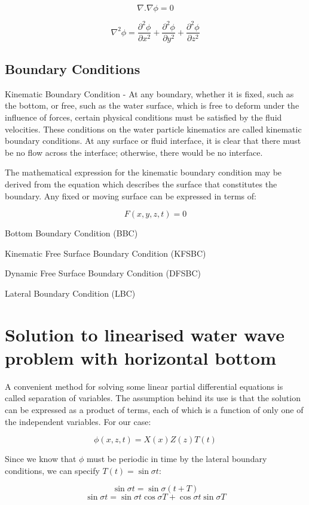 \documentclass{report}
\begin{document}
\[ \nabla . \nabla\phi =0 \]

\[ \nabla^2 \phi = \frac{\partial^2 \phi}{\partial x^2} + \frac{\partial^2 \phi}{\partial y^2} + \frac{\partial^2 \phi}{\partial z^2} \]

\subsection{Boundary Conditions}

Kinematic Boundary Condition - At any boundary, whether it is fixed, such as the bottom, or free, such as the water surface, which is free to deform under the influence of forces, certain physical conditions must be satisfied by the fluid velocities. These conditions on the water particle kinematics are called kinematic boundary conditions. At any surface or fluid interface, it is clear that there must be no flow across the interface; otherwise, there would be no interface.

The mathematical expression for the kinematic boundary condition may be derived from the equation which describes the surface that constitutes the boundary. Any fixed or moving surface can be expressed in terms of:

\[ F(x, y, z, t) = 0 \]

Bottom Boundary Condition (BBC)

Kinematic Free Surface Boundary Condition (KFSBC)

Dynamic Free Surface Boundary Condition (DFSBC)

Lateral Boundary Condition (LBC)

\section{Solution to linearised water wave problem with horizontal bottom}

A convenient method for solving some linear partial differential equations is called separation of variables. The assumption behind its use is that the solution can be expressed as a product of terms, each of which is a function of only one of the independent variables. For our case:

\[ \phi(x,z,t)=X(x)Z(z)T(t) \]

Since we know that \( \phi \) must be periodic in time by the lateral boundary conditions, we can specify \( T(t) = \sin \sigma t \):

\[ \sin\sigma t = \sin\sigma (t+T) \]
\[ \sin\sigma t = \sin\sigma t \cos\sigma T + \cos\sigma t \sin\sigma T \]
\end{document}
